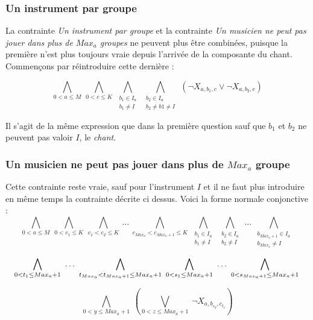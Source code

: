 \documentclass[11pt]{article}
\begin{document}
\subsubsection{Un instrument par groupe}

La contrainte \textsl{Un instrument par groupe} et la contrainte \textsl{Un musicien ne peut pas jouer dans plus de $Max_a$ groupes} ne peuvent plus être combinées, puisque la première n'est plus toujours vraie depuis l'arrivée de la composante du chant.\\

Commençons par réintroduire cette dernière :

$$\bigwedge\limits_{0<a\le M}\ \bigwedge\limits_{0<c\le K}\ \bigwedge\limits_{\substack{b_1\in I_a \\ b_1 \ne I}}\ \bigwedge\limits_{\substack{b_2\in I_a \\ b_2 \ne b1 \ne I}}\ \left(\neg X_{a,b_1,c} \vee \neg X_{a,b_2,c}\right)$$

Il s'agit de la même expression que dans la première question sauf que $b_1$ et $b_2$ ne peuvent pas valoir $I$, le \textsl{chant}.

\subsubsection{Un musicien ne peut pas jouer dans plus de $Max_a$ groupe}

Cette contrainte reste vraie, sauf pour l'instrument $I$ et il ne faut plus introduire en même temps la contrainte décrite ci dessus. Voici la forme normale conjonctive :\\

$$\bigwedge\limits_{0<a\le M}\ \bigwedge\limits_{0<c_1\le K}\ \bigwedge\limits_{c_1<c_2\le K}\ \ldots\ \bigwedge\limits_{c_{{Max_a}}<c_{Max_{a}+1}\le K}\ \bigwedge\limits_{\substack{b_1 \in I_a \\ b_1 \ne I}}\ \bigwedge\limits_{\substack{b_2 \in I_a \\ b_2 \ne I}}\ \ldots\  \bigwedge\limits_{\substack{b_{Max_a+1} \in I_a \\ b_{Max_a} \ne I}} $$

$$ \bigwedge\limits_{0<t_{1}\le Max_a+1}\  \ldots\  \bigwedge\limits_{t_{Max_a}<t_{Max_a+1}\le Max_a+1}\ \bigwedge\limits_{0<s_1\le Max_a+1}\  \ldots\  \bigwedge\limits_{0<s_{Max_a+1}\le Max_a+1}\\$$

$$ \bigwedge\limits_{0<y\le Max_a+1}\  \left( \bigvee\limits_{0<z\le Max_a+1}\  \neg X_{a,b_{s_{y}},c_{t_{z}}}\right)$$
\end{document}
